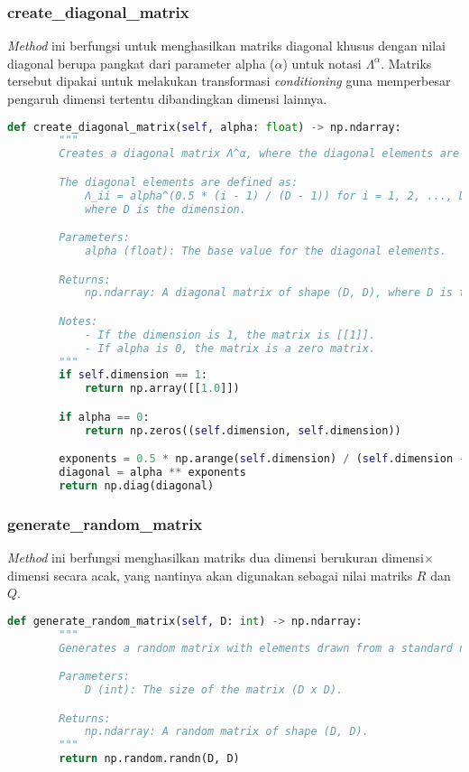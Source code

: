 \subsubsection{create\_diagonal\_matrix}
\textit{Method} ini berfungsi untuk menghasilkan matriks diagonal khusus dengan nilai diagonal berupa pangkat dari parameter alpha ($\alpha $) untuk notasi $\Lambda^{\alpha}$. Matriks tersebut dipakai untuk melakukan transformasi \textit{conditioning} guna memperbesar pengaruh dimensi tertentu dibandingkan dimensi lainnya.
\begin{lstlisting}[language=Python, caption=\textit{method} untuk menghasilkan matriks diagonal, label=lst:init_cec]
    def create_diagonal_matrix(self, alpha: float) -> np.ndarray:
        """
        Creates a diagonal matrix Λ^α, where the diagonal elements are powers of α.

        The diagonal elements are defined as:
            Λ_ii = alpha^(0.5 * (i - 1) / (D - 1)) for i = 1, 2, ..., D,
            where D is the dimension.

        Parameters:
            alpha (float): The base value for the diagonal elements.

        Returns:
            np.ndarray: A diagonal matrix of shape (D, D), where D is the dimension.

        Notes:
            - If the dimension is 1, the matrix is [[1]].
            - If alpha is 0, the matrix is a zero matrix.
        """
        if self.dimension == 1:
            return np.array([[1.0]])

        if alpha == 0:
            return np.zeros((self.dimension, self.dimension))

        exponents = 0.5 * np.arange(self.dimension) / (self.dimension - 1)
        diagonal = alpha ** exponents
        return np.diag(diagonal)
\end{lstlisting}
\subsubsection{generate\_random\_matrix}
\textit{Method} ini berfungsi menghasilkan matriks dua dimensi berukuran dimensi$\times$dimensi secara acak, yang nantinya akan digunakan sebagai nilai matriks $R$ dan $Q$.
\begin{lstlisting}[language=Python, caption=\textit{method} untuk menghasilkan matriks dengan nilai acak, label=lst:init_cec]
    def generate_random_matrix(self, D: int) -> np.ndarray:
        """
        Generates a random matrix with elements drawn from a standard normal distribution.

        Parameters:
            D (int): The size of the matrix (D x D).

        Returns:
            np.ndarray: A random matrix of shape (D, D).
        """
        return np.random.randn(D, D)
\end{lstlisting}

